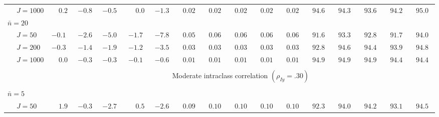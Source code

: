 \begin{sidewaystable}
\begin{threeparttable}
\begin{tabular}{llccccccccccccccc}
 & \nopagebreak $\;J=1000$  & $\phantom{-}0.2\phantom{0}$ & ${-}0.8\phantom{0}$ & ${-}0.5\phantom{0}$ & $\phantom{-}0.0\phantom{0}$ & ${-}1.3\phantom{0}$ & $\phantom{0}0.02\phantom{0}$ & $\phantom{0}0.02\phantom{0}$ & $\phantom{0}0.02\phantom{0}$ & $\phantom{0}0.02\phantom{0}$ & $\phantom{0}0.02\phantom{0}$ & $\phantom{0}94.6\phantom{0}$ & $\phantom{0}94.3\phantom{0}$ & $\phantom{0}93.6\phantom{0}$ & $\phantom{0}94.2\phantom{0}$ & $\phantom{0}95.0\phantom{0}$ \\
\multicolumn{4}{l}{$\bar{n}=20$} \\  & \nopagebreak $\;J=50$  & ${-}0.1\phantom{0}$ & ${-}2.6\phantom{0}$ & ${-}5.0\phantom{0}$ & ${-}1.7\phantom{0}$ & ${-}7.8\phantom{0}$ & $\phantom{0}0.05\phantom{0}$ & $\phantom{0}0.06\phantom{0}$ & $\phantom{0}0.06\phantom{0}$ & $\phantom{0}0.06\phantom{0}$ & $\phantom{0}0.06\phantom{0}$ & $\phantom{0}91.6\phantom{0}$ & $\phantom{0}93.3\phantom{0}$ & $\phantom{0}92.8\phantom{0}$ & $\phantom{0}91.7\phantom{0}$ & $\phantom{0}94.0\phantom{0}$ \\
 & \nopagebreak $\;J=200$  & ${-}0.3\phantom{0}$ & ${-}1.4\phantom{0}$ & ${-}1.9\phantom{0}$ & ${-}1.2\phantom{0}$ & ${-}3.5\phantom{0}$ & $\phantom{0}0.03\phantom{0}$ & $\phantom{0}0.03\phantom{0}$ & $\phantom{0}0.03\phantom{0}$ & $\phantom{0}0.03\phantom{0}$ & $\phantom{0}0.03\phantom{0}$ & $\phantom{0}92.8\phantom{0}$ & $\phantom{0}94.6\phantom{0}$ & $\phantom{0}94.4\phantom{0}$ & $\phantom{0}93.9\phantom{0}$ & $\phantom{0}94.8\phantom{0}$ \\
 & \nopagebreak $\;J=1000$  & $\phantom{-}0.0\phantom{0}$ & ${-}0.3\phantom{0}$ & ${-}0.3\phantom{0}$ & ${-}0.1\phantom{0}$ & ${-}0.6\phantom{0}$ & $\phantom{0}0.01\phantom{0}$ & $\phantom{0}0.01\phantom{0}$ & $\phantom{0}0.01\phantom{0}$ & $\phantom{0}0.01\phantom{0}$ & $\phantom{0}0.01\phantom{0}$ & $\phantom{0}94.9\phantom{0}$ & $\phantom{0}94.9\phantom{0}$ & $\phantom{0}94.9\phantom{0}$ & $\phantom{0}94.4\phantom{0}$ & $\phantom{0}94.4\phantom{0}$ \\
[0.5ex]\hline\\[-1.6ex] 
& & \multicolumn{15}{c}{Moderate intraclass correlation $(\rho_{Iy}=.30)$} \\[0.6ex]\hline\\[-1.8ex]
\multicolumn{4}{l}{$\bar{n}=5$} \\  & \nopagebreak $\;J=50$  & $\phantom{-}1.9\phantom{0}$ & ${-}0.3\phantom{0}$ & ${-}2.7\phantom{0}$ & $\phantom{-}0.5\phantom{0}$ & ${-}2.6\phantom{0}$ & $\phantom{0}0.09\phantom{0}$ & $\phantom{0}0.10\phantom{0}$ & $\phantom{0}0.10\phantom{0}$ & $\phantom{0}0.10\phantom{0}$ & $\phantom{0}0.10\phantom{0}$ & $\phantom{0}92.3\phantom{0}$ & $\phantom{0}94.0\phantom{0}$ & $\phantom{0}94.2\phantom{0}$ & $\phantom{0}93.1\phantom{0}$ & $\phantom{0}94.5\phantom{0}$ \\

\end{tabular}
\end{threeparttable}
\end{sidewaystable}
